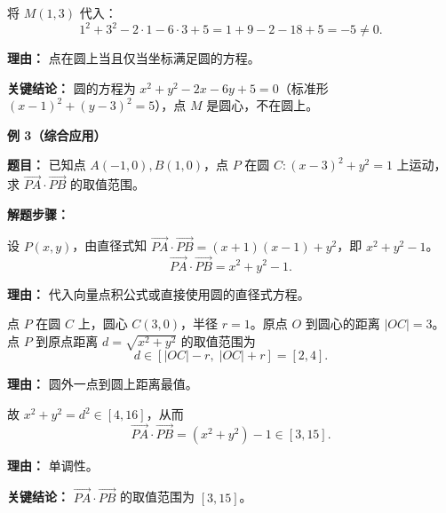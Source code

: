 \begin{examplebox}
\begin{description}[style=nextline, leftmargin=2.8em, labelsep=0.5em, itemsep=0.45em]
		\item[\textbf{第三步（验证点）：}] 将 $M(1,3)$ 代入：
			\[
				1^2+3^2-2\cdot1-6\cdot3+5=1+9-2-18+5=-5\neq 0.
			\]
			\par\textbf{理由：} 点在圆上当且仅当坐标满足圆的方程。
	\end{description}

	\textbf{\textcolor{CExample}{关键结论：}}
	圆的方程为 $x^2+y^2-2x-6y+5=0$（标准形 $(x-1)^2+(y-3)^2=5$），点 $M$ 是圆心，不在圆上。

	\medskip
	\textbf{\textcolor{CExample}{例 3（综合应用）}}

	\textbf{\textcolor{CExample}{题目：}}
	已知点 $A(-1,0),B(1,0)$，点 $P$ 在圆 $C:(x-3)^2+y^2=1$ 上运动，求 $\overrightarrow{PA}\cdot\overrightarrow{PB}$ 的取值范围。

	\textbf{\textcolor{CExample}{解题步骤：}}
	\begin{description}[style=nextline, leftmargin=2.8em, labelsep=0.5em, itemsep=0.45em]
		\item[\textbf{第一步（用结论转化）：}] 设 $P(x,y)$，由直径式知 $\overrightarrow{PA}\cdot\overrightarrow{PB} = (x+1)(x-1)+y^2$，即 $x^2+y^2-1$。
			\[
				\overrightarrow{PA}\cdot\overrightarrow{PB} = x^2+y^2-1.
			\]
			\par\textbf{理由：} 代入向量点积公式或直接使用圆的直径式方程。

		\item[\textbf{第二步（几何条件分析）：}] 点 $P$ 在圆 $C$ 上，圆心 $C(3,0)$，半径 $r=1$。原点 $O$ 到圆心的距离 $|OC|=3$。点 $P$ 到原点距离 $d=\sqrt{x^2+y^2}$ 的取值范围为
			\[
				d \in [|OC|-r,\; |OC|+r] = [2,4].
			\]
			\par\textbf{理由：} 圆外一点到圆上距离最值。

		\item[\textbf{第三步（计算最值）：}] 故 $x^2+y^2 = d^2 \in [4,16]$，从而
			\[
				\overrightarrow{PA}\cdot\overrightarrow{PB} = (x^2+y^2)-1 \in [3,15].
			\]
			\par\textbf{理由：} 单调性。
	\end{description}

	\textbf{\textcolor{CExample}{关键结论：}}
	$\overrightarrow{PA}\cdot\overrightarrow{PB}$ 的取值范围为 $[3,15]$。
\end{examplebox}

